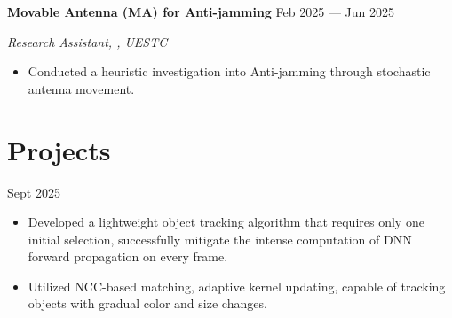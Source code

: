 \documentclass[a4paper,12pt]{article}
\newcommand{\MYhref}[3][black]{\href{#2}{\color{#1}{#3}}}%
\begin{document}


\textbf{Movable Antenna (MA) for Anti-jamming} \hfill Feb 2025 --- Jun 2025

\vspace{-0.5em} \begin{small} \textit{Research Assistant, \MYhref{https://scholar.google.com.sg/citations?user=JtHltIoAAAAJ&hl=en-EN}{Professor Weidong Mei}, UESTC} \end{small} \vspace{-0.5em}

\begin{itemize}
    \setlength\itemsep{-0.5em}
    \item Conducted a heuristic investigation into Anti-jamming through stochastic antenna movement.
\end{itemize}

\section{Projects}

\textbf{\MYhref{https://github.com/Marcobisky/YOPO}{YOPO: You Only Pick Once -- Light Object Tracking Algorithm}} \hfill Sept 2025

\begin{itemize}
    \setlength\itemsep{-0.5em}
    \item Developed a lightweight object tracking algorithm that requires only one initial selection, successfully mitigate the intense computation of DNN forward propagation on every frame.
    \item Utilized NCC-based matching, adaptive kernel updating, capable of tracking objects with gradual color and size changes.
\end{itemize}
\end{document}
